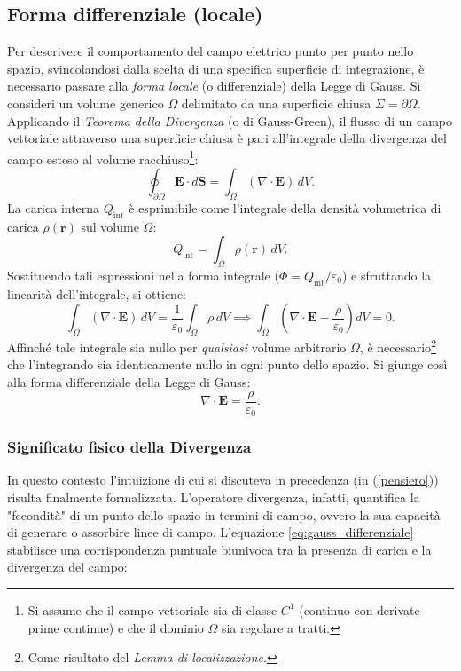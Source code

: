\documentclass[a4paper,11pt]{report}
\begin{document}
\subsection{Forma differenziale (locale)}
Per descrivere il comportamento del campo elettrico punto per punto nello spazio, svincolandosi dalla scelta di una specifica superficie di integrazione, è necessario passare alla \textit{forma locale} (o differenziale) della Legge di Gauss.
Si consideri un volume generico $\Omega$ delimitato da una superficie chiusa $\Sigma = \partial \Omega$.
Applicando il \textit{Teorema della Divergenza} (o di Gauss-Green), il flusso di un campo vettoriale attraverso una superficie chiusa è pari all'integrale della divergenza del campo esteso al volume racchiuso\footnote{Si assume che il campo vettoriale sia di classe $C^1$ (continuo con derivate prime continue) e che il dominio $\Omega$ sia regolare a tratti.}:
\begin{equation}
    \oint_{\partial \Omega} \bm{E} \cdot d\bm{S} = \int_\Omega (\nabla \cdot \bm{E}) \, dV.
    \label{eq:teorema_divergenza}
\end{equation}
La carica interna $Q_{\text{int}}$ è esprimibile come l'integrale della densità volumetrica di carica $\rho(\bm{r})$ sul volume $\Omega$:
\begin{equation}
    Q_{\text{int}} = \int_\Omega \rho(\bm{r}) \, dV.
\end{equation}
Sostituendo tali espressioni nella forma integrale ($\Phi = Q_{\text{int}}/\varepsilon_0$) e sfruttando la linearità dell'integrale, si ottiene:
\begin{equation}
    \int_\Omega (\nabla \cdot \bm{E}) \, dV = \frac{1}{\varepsilon_0} \int_\Omega \rho \, dV \implies \int_\Omega \left( \nabla \cdot \bm{E} - \frac{\rho}{\varepsilon_0} \right) dV = 0.
\end{equation}
Affinché tale integrale sia nullo per \textit{qualsiasi} volume arbitrario $\Omega$, è necessario\footnote{Come risultato del \textit{Lemma di localizzazione}.} che l'integrando sia identicamente nullo in ogni punto dello spazio. Si giunge così alla forma differenziale della Legge di Gauss:
\begin{equation}
    \boxed{\nabla \cdot \bm{E} = \frac{\rho}{\varepsilon_0}}.
    \label{eq:gauss_differenziale}
\end{equation}

\subsubsection{Significato fisico della Divergenza}
In questo contesto l'intuizione di cui si discuteva in precedenza (in (\ref{pensiero})) risulta finalmente formalizzata. L'operatore divergenza, infatti, quantifica la "fecondità" di un punto dello spazio in termini di campo, ovvero la sua capacità di generare o assorbire linee di campo. L'equazione \eqref{eq:gauss_differenziale} stabilisce una corrispondenza puntuale biunivoca tra la presenza di carica e la divergenza del campo:
\end{document}

